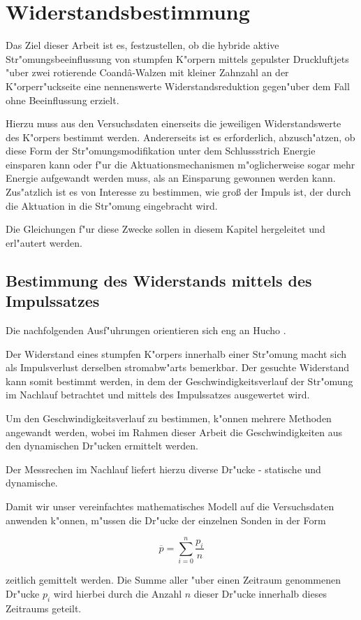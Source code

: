 \chapter{Widerstandsbestimmung}\label{s:widerstandsbestimmung}

Das Ziel dieser Arbeit ist es, festzustellen, ob die hybride aktive Str"omungsbeeinflussung von stumpfen K"orpern mittels gepulster Druckluftjets "uber zwei rotierende Coand\^{a}-Walzen mit kleiner Zahnzahl an der K"orperr"uckseite eine nennenswerte Widerstandsreduktion gegen"uber dem Fall ohne Beeinflussung erzielt.

Hierzu muss aus den Versuchsdaten einerseits die jeweiligen Widerstandswerte des K"orpers bestimmt werden. Andererseits ist es erforderlich, abzusch"atzen, ob diese Form der Str"omungsmodifikation unter dem Schlussstrich Energie einsparen kann oder f"ur die Aktuationsmechanismen m"oglicherweise sogar mehr Energie aufgewandt werden muss, als an Einsparung gewonnen werden kann.
Zus"atzlich ist es von Interesse zu bestimmen, wie gro\ss{} der Impuls ist, der durch die Aktuation in die Str"omung eingebracht wird.

Die Gleichungen f"ur diese Zwecke sollen in diesem Kapitel hergeleitet und erl"autert werden.

\section{Bestimmung des Widerstands mittels des Impulssatzes}

Die nachfolgenden Ausf"uhrungen orientieren sich eng an  Hucho \cite{Hucho.2011}.

Der Widerstand eines stumpfen K"orpers innerhalb einer Str"omung macht sich als Impulsverlust derselben stromabw"arts bemerkbar. Der gesuchte Widerstand kann somit bestimmt werden, in dem der Geschwindigkeitsverlauf der Str"omung im Nachlauf betrachtet und mittels des Impulssatzes ausgewertet wird. 

Um den Geschwindigkeitsverlauf zu bestimmen, k"onnen mehrere Methoden angewandt werden, wobei im Rahmen dieser Arbeit die Geschwindigkeiten aus den dynamischen Dr"ucken ermittelt werden.

Der Messrechen im Nachlauf liefert hierzu diverse Dr"ucke - statische und dynamische.

Damit wir unser vereinfachtes mathematisches Modell auf die Versuchsdaten anwenden k"onnen, m"ussen die Dr"ucke der einzelnen Sonden in der Form
\begin{center}	
	\begin{equation}
		\overline{p}=\sum_{i=0}^{n}\frac{p_i}{n}
	\end{equation}
\end{center}
zeitlich gemittelt werden.
Die Summe aller "uber einen Zeitraum genommenen Dr"ucke $p_i$ wird hierbei durch die Anzahl $n$ dieser Dr"ucke innerhalb dieses Zeitraums geteilt.

